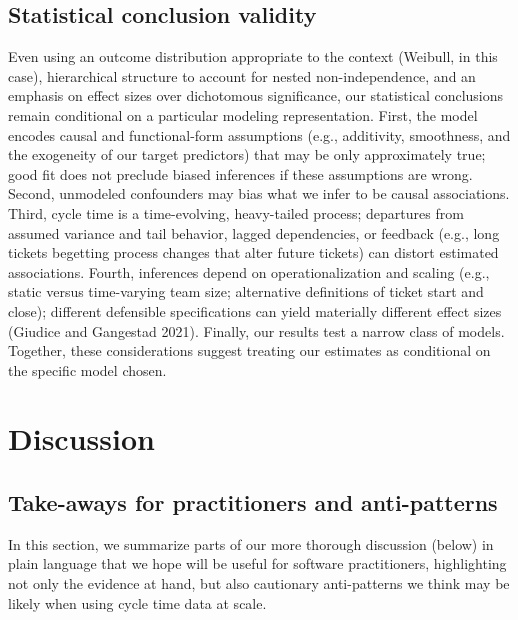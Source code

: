 \documentclass[
]{article}
\begin{document}
\subsection{Statistical conclusion
validity}\label{statistical-conclusion-validity}

Even using an outcome distribution appropriate to the context (Weibull,
in this case), hierarchical structure to account for nested
non-independence, and an emphasis on effect sizes over dichotomous
significance, our statistical conclusions remain conditional on a
particular modeling representation. First, the model encodes causal and
functional-form assumptions (e.g., additivity, smoothness, and the
exogeneity of our target predictors) that may be only approximately
true; good fit does not preclude biased inferences if these assumptions
are wrong. Second, unmodeled confounders may bias what we infer to be
causal associations. Third, cycle time is a time-evolving, heavy-tailed
process; departures from assumed variance and tail behavior, lagged
dependencies, or feedback (e.g., long tickets begetting process changes
that alter future tickets) can distort estimated associations. Fourth,
inferences depend on operationalization and scaling (e.g., static versus
time-varying team size; alternative definitions of ticket start and
close); different defensible specifications can yield materially
different effect sizes (Giudice and Gangestad 2021). Finally, our
results test a narrow class of models. Together, these considerations
suggest treating our estimates as conditional on the specific model
chosen.

\section{Discussion}\label{discussion}

\subsection{Take-aways for practitioners and
anti-patterns}\label{take-aways-for-practitioners-and-anti-patterns}

In this section, we summarize parts of our more thorough discussion
(below) in plain language that we hope will be useful for software
practitioners, highlighting not only the evidence at hand, but also
cautionary anti-patterns we think may be likely when using cycle time
data at scale.
\end{document}
